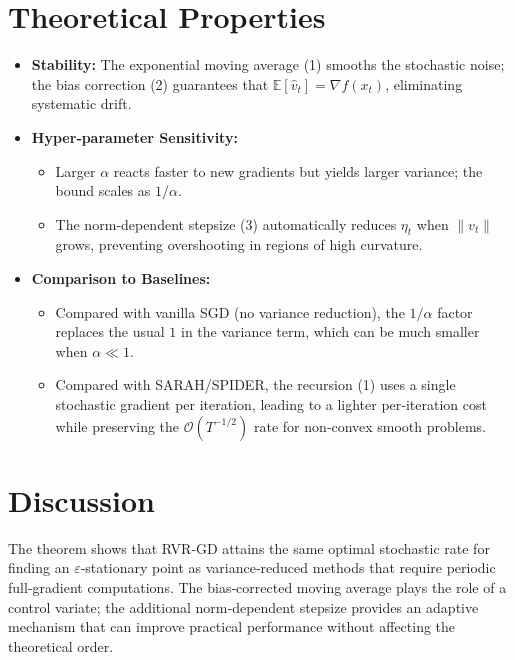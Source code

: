 \documentclass{article}
\newcommand{\E}{\mathbb{E}}
\begin{document}
\section*{Theoretical Properties}
\begin{itemize}[noitemsep]
  \item \textbf{Stability:} The exponential moving average (1) smooths the stochastic noise; the bias correction (2) guarantees that $\E[\hat v_t]=\nabla f(x_t)$, eliminating systematic drift.
  \item \textbf{Hyper‑parameter Sensitivity:}
    \begin{itemize}
      \item Larger $\alpha$ reacts faster to new gradients but yields larger variance; the bound scales as $1/\alpha$.
      \item The norm‑dependent stepsize (3) automatically reduces $\eta_t$ when $\|v_t\|$ grows, preventing overshooting in regions of high curvature.
    \end{itemize}
  \item \textbf{Comparison to Baselines:}
    \begin{itemize}
      \item Compared with vanilla SGD (no variance reduction), the $1/\alpha$ factor replaces the usual $1$ in the variance term, which can be much smaller when $\alpha\ll1$.
      \item Compared with SARAH/SPIDER, the recursion (1) uses a single stochastic gradient per iteration, leading to a lighter per‑iteration cost while preserving the $\mathcal{O}(T^{-1/2})$ rate for non‑convex smooth problems.
    \end{itemize}
\end{itemize}

\section*{Discussion}
The theorem shows that RVR‑GD attains the same optimal stochastic rate for finding an $\varepsilon$‑stationary point as variance‑reduced methods that require periodic full‑gradient computations. The bias‑corrected moving average plays the role of a control variate; the additional norm‑dependent stepsize provides an adaptive mechanism that can improve practical performance without affecting the theoretical order.
\end{document}
